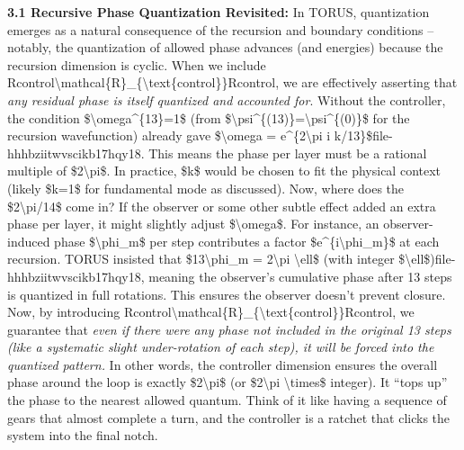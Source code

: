 \documentclass[
]{article}
\begin{document}
\textbf{3.1 Recursive Phase Quantization Revisited:} In TORUS,
quantization emerges as a natural consequence of the recursion and
boundary conditions -- notably, the quantization of allowed phase
advances (and energies) because the recursion dimension is
cyclic\hspace{0pt}. When we include
Rcontrol\textbackslash mathcal\{R\}\_\{\textbackslash text\{control\}\}Rcontrol\hspace{0pt},
we are effectively asserting that \emph{any residual phase is itself
quantized and accounted for}. Without the controller, the condition
\$\textbackslash omega\^{}\{13\}=1\$ (from
\$\textbackslash psi\^{}\{(13)\}=\textbackslash psi\^{}\{(0)\}\$ for the
recursion wavefunction) already gave \$\textbackslash omega =
e\^{}\{2\textbackslash pi i
k/13\}\$\hspace{0pt}file-hhhbziitwvscikb17hqy18. This means the phase
per layer must be a rational multiple of \$2\textbackslash pi\$. In
practice, \$k\$ would be chosen to fit the physical context (likely
\$k=1\$ for fundamental mode as discussed). Now, where does the
\$2\textbackslash pi/14\$ come in? If the observer or some other subtle
effect added an extra phase per layer, it might slightly adjust
\$\textbackslash omega\$. For instance, an observer-induced phase
\$\textbackslash phi\_m\$ per step contributes a factor
\$e\^{}\{i\textbackslash phi\_m\}\$ at each recursion\hspace{0pt}. TORUS
insisted that \$13\textbackslash phi\_m = 2\textbackslash pi
\textbackslash ell\$ (with integer
\$\textbackslash ell\$)\hspace{0pt}file-hhhbziitwvscikb17hqy18, meaning
the observer's cumulative phase after 13 steps is quantized in full
rotations. This ensures the observer doesn't prevent closure. Now, by
introducing
Rcontrol\textbackslash mathcal\{R\}\_\{\textbackslash text\{control\}\}Rcontrol\hspace{0pt},
we guarantee that \emph{even if there were any phase not included in the
original 13 steps (like a systematic slight under-rotation of each
step), it will be forced into the quantized pattern.} In other words,
the controller dimension ensures the overall phase around the loop is
exactly \$2\textbackslash pi\$ (or \$2\textbackslash pi
\textbackslash times\$ integer). It ``tops up'' the phase to the nearest
allowed quantum. Think of it like having a sequence of gears that almost
complete a turn, and the controller is a ratchet that clicks the system
into the final notch.
\end{document}
